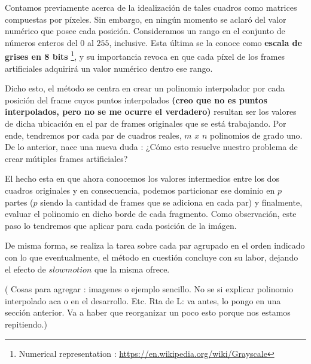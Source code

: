 Contamos previamente acerca de la idealizaci\'on de tales cuadros como matrices compuestas por p\'ixeles. Sin embargo, en ning\'un momento se aclar\'o del valor num\'erico que posee cada posici\'on. Consideramos un rango en el conjunto de n\'umeros enteros del $0$ al $255$, inclusive. Esta \'ultima se la conoce como \textbf{escala de grises en 8 bits} \footnote{Numerical representation : \url{https://en.wikipedia.org/wiki/Grayscale}}, y su importancia revoca en que cada p\'ixel de los frames artificiales adquirir\'a un valor num\'erico dentro ese rango.

Dicho esto, el m\'etodo se centra en crear un polinomio interpolador por cada posici\'on del frame cuyos puntos interpolados \textbf{(creo que no es puntos interpolados, pero no se me ocurre el verdadero)} resultan ser los valores de dicha ubicaci\'on en el par de frames originales que se est\'a trabajando. Por ende, tendremos por cada par de cuadros reales, $m$ $x$ $n$ polinomios de grado uno. De lo anterior, nace una nueva duda : ¿C\'omo esto resuelve nuestro problema de crear m\'utiples frames artificiales?

El hecho esta en que ahora conocemos los valores intermedios entre los dos cuadros originales y en consecuencia, podemos particionar ese dominio en $p$ partes ($p$ siendo la cantidad de frames que se adiciona en cada par) y finalmente, evaluar el polinomio en dicho borde de cada fragmento. Como observaci\'on, este paso lo tendremos que aplicar para cada posici\'on de la im\'agen.

De misma forma, se realiza la tarea sobre cada par agrupado en el orden indicado con lo que eventualmente, el m\'etodo en cuesti\'on concluye con su labor, dejando el efecto de $slowmotion$ que la misma ofrece.

( Cosas para agregar : imagenes o ejemplo sencillo. No se si explicar polinomio interpolado aca o en el desarrollo. Etc. Rta de L: va antes, lo pongo en una sección anterior. Va a haber que reorganizar un poco esto porque nos estamos repitiendo.) 